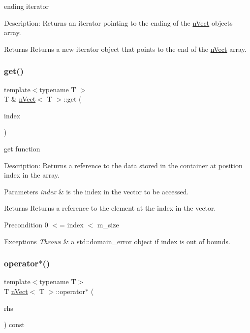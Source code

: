 ending iterator 

Description\+: Returns an iterator pointing to the ending of the \hyperlink{classnVect}{n\+Vect} object\textquotesingle{}s array. \begin{DoxyReturn}{Returns}
Returns a new iterator object that points to the end of the \hyperlink{classnVect}{n\+Vect} array. 
\end{DoxyReturn}
\mbox{\label{classnVect_a4b757cc98836654ee2929197d40d9055}} 
\subsubsection{\texorpdfstring{get()}{get()}}
{\footnotesize\ttfamily template$<$typename T $>$ \\
T \& \hyperlink{classnVect}{n\+Vect}$<$ T $>$\+::get (\begin{DoxyParamCaption}\item[{const int}]{index }\end{DoxyParamCaption})}



get function 

Description\+: Returns a reference to the data stored in the container at position index in the array. 
\begin{DoxyParams}{Parameters}
{\em index} & is the index in the vector to be accessed. \\
\hline
\end{DoxyParams}
\begin{DoxyReturn}{Returns}
Returns a reference to the element at the index in the vector. 
\end{DoxyReturn}
\begin{DoxyPrecond}{Precondition}
0 $<$= index $<$ m\+\_\+size 
\end{DoxyPrecond}

\begin{DoxyExceptions}{Exceptions}
{\em Throws} & a std\+::domain\+\_\+error object if index is out of bounds. \\
\hline
\end{DoxyExceptions}
\mbox{\label{classnVect_ac5933c6480457c627ca43a8b9d1cfbaf}} 
\subsubsection{\texorpdfstring{operator$\ast$()}{operator*()}}
{\footnotesize\ttfamily template$<$typename T$>$ \\
T \hyperlink{classnVect}{n\+Vect}$<$ T $>$\+::operator$\ast$ (\begin{DoxyParamCaption}\item[{const \hyperlink{classnVect}{n\+Vect}$<$ T $>$ \&}]{rhs }\end{DoxyParamCaption}) const}



